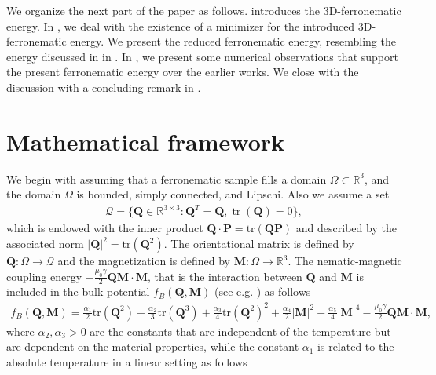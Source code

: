 \documentclass{article}
\def\Qvec{\mathbf{Q}}
\def\Pvec{\mathbf{P}}
\def \Mvec{\mathbf{M}}
\begin{document}
We organize the next part of the paper as follows.  introduces the 3D-ferronematic energy. In , we deal with the existence of a minimizer for the introduced 3D-ferronematic energy. We present the reduced ferronematic energy, resembling the energy discussed in \cite{dutta2025study} in . In , we present some numerical observations that support the present ferronematic energy over the earlier works. We close with the discussion with a concluding remark in .

\section{Mathematical framework}\label{mathematical framework}
We begin with assuming that a ferronematic sample fills a domain $\Omega\subset\mathbb R^3$, and the domain $\Omega$ is bounded, simply connected, and Lipschi. Also we assume a set
\begin{eqnarray}
\mathcal{Q}=\bigl\{\Qvec\in\mathbb R^{3\times 3}: \Qvec^T=\Qvec, \operatorname{tr}(\Qvec)=0\bigl\},\label{eq:3d_set}
\end{eqnarray} which is endowed with the inner product $\Qvec\cdot\Pvec = \mbox{tr}\left(\Qvec\Pvec\right)$ and described by the associated norm $|\Qvec|^2 = \mbox{tr}(\Qvec^2)$. The orientational matrix is defined by $\Qvec: \Omega\rightarrow \mathcal{Q}$ and the magnetization is defined by $\Mvec: \Omega\rightarrow \mathbb R^3$. %
The nematic-magnetic coupling energy $- \frac{\mu_0\gamma}{2}\Qvec\Mvec\cdot\Mvec$, that is the interaction between $\Qvec$ and $\Mvec$ is included in the bulk potential $f_B\left(\Qvec, \Mvec\right)$ (see e.g. \cite{Gennes, hubert2008magnetic, Mertelj}) as follows
\begin{align}\label{bulk_couplin}
f_B\left(\Qvec, \Mvec\right) = \frac{\alpha_1}{2}\mbox{tr}(\Qvec^2) + \frac{\alpha_2}{3}\mbox{tr}(\Qvec^3) + \frac{\alpha_3}{4}\mbox{tr}(\Qvec^2)^2 + \frac{\alpha_4}{2}|\Mvec|^2 + \frac{\alpha_5}{4}|\Mvec|^4 - \frac{\mu_0\gamma}{2}\Qvec\Mvec\cdot\Mvec,
\end{align}
where $\alpha_2, \alpha_3 > 0$ are the constants that are independent of the temperature but are dependent on the material properties, while the constant $\alpha_1$ is related to the absolute temperature in a linear setting as follows
\end{document}
